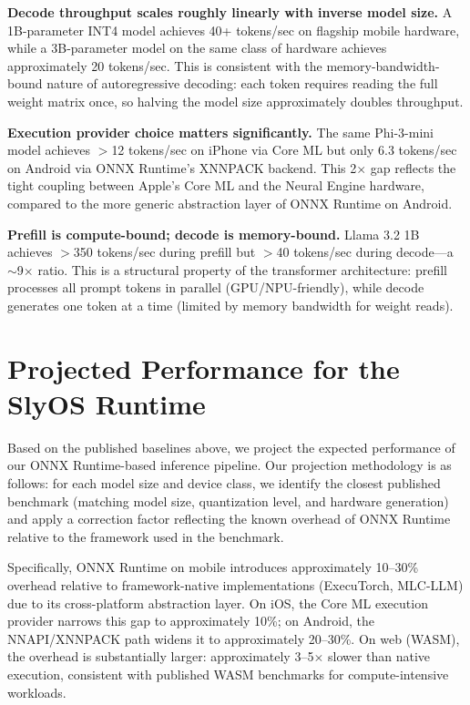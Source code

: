 \documentclass[12pt, letterpaper, twoside]{report}
\begin{document}
\textbf{Decode throughput scales roughly linearly with inverse model size.} A 1B-parameter INT4 model achieves 40+ tokens/sec on flagship mobile hardware, while a 3B-parameter model on the same class of hardware achieves approximately 20 tokens/sec. This is consistent with the memory-bandwidth-bound nature of autoregressive decoding: each token requires reading the full weight matrix once, so halving the model size approximately doubles throughput.

\textbf{Execution provider choice matters significantly.} The same Phi-3-mini model achieves $>$12 tokens/sec on iPhone via Core ML but only 6.3 tokens/sec on Android via ONNX Runtime's XNNPACK backend. This 2$\times$ gap reflects the tight coupling between Apple's Core ML and the Neural Engine hardware, compared to the more generic abstraction layer of ONNX Runtime on Android.

\textbf{Prefill is compute-bound; decode is memory-bound.} Llama 3.2 1B achieves $>$350 tokens/sec during prefill but $>$40 tokens/sec during decode---a $\sim$9$\times$ ratio. This is a structural property of the transformer architecture: prefill processes all prompt tokens in parallel (GPU/NPU-friendly), while decode generates one token at a time (limited by memory bandwidth for weight reads).

\section{Projected Performance for the SlyOS Runtime}
\label{sec:projected_perf}

Based on the published baselines above, we project the expected performance of our ONNX Runtime-based inference pipeline. Our projection methodology is as follows: for each model size and device class, we identify the closest published benchmark (matching model size, quantization level, and hardware generation) and apply a correction factor reflecting the known overhead of ONNX Runtime relative to the framework used in the benchmark.

Specifically, ONNX Runtime on mobile introduces approximately 10--30\% overhead relative to framework-native implementations (ExecuTorch, MLC-LLM) due to its cross-platform abstraction layer. On iOS, the Core ML execution provider narrows this gap to approximately 10\%; on Android, the NNAPI/XNNPACK path widens it to approximately 20--30\%. On web (WASM), the overhead is substantially larger: approximately 3--5$\times$ slower than native execution, consistent with published WASM benchmarks for compute-intensive workloads.
\end{document}
